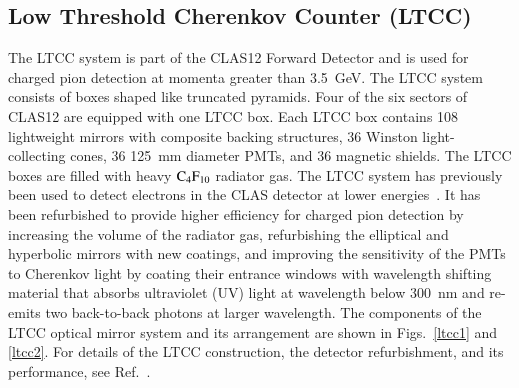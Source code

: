 \documentclass[final,3p,twocolumn]{elsarticle}
\begin{document}
\subsection{Low Threshold Cherenkov Counter (LTCC)}

The LTCC system is part of the CLAS12  Forward Detector and is used for charged pion detection at momenta
greater than 3.5~GeV. The LTCC system consists of boxes shaped like truncated pyramids. Four of the six sectors
of CLAS12 are equipped with one LTCC box. Each LTCC box contains 108 lightweight mirrors with composite
backing structures, 36 Winston light-collecting cones, 36 125~mm diameter PMTs, and 36 magnetic shields. The
LTCC boxes are filled with heavy $\rm C_4F_{10}$ radiator gas. The LTCC system has previously been used to
detect electrons in the CLAS detector at lower energies~\cite{Adams:2001kk}. It has been refurbished to provide
higher efficiency for charged pion detection by increasing the volume of the radiator gas, refurbishing the elliptical
and hyperbolic mirrors with new coatings, and improving the sensitivity of the PMTs to Cherenkov light by coating
their entrance windows with wavelength shifting material that absorbs ultraviolet (UV) light at wavelength below
300~nm and re-emits two back-to-back photons at larger wavelength. The components of the LTCC optical mirror
system and its arrangement are shown in Figs.~\ref{ltcc1} and \ref{ltcc2}.  For details of the LTCC construction,
the detector refurbishment, and its performance, see Ref.~\cite{LTCC}.   
\end{document}
